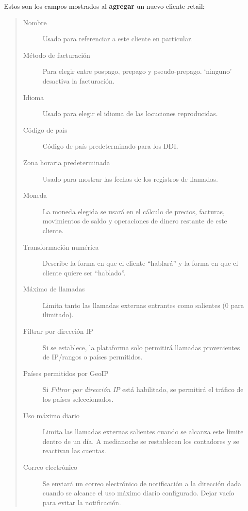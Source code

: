 \documentclass[letterpaper,10pt,spanish]{sphinxmanual}
\begin{document}
Estos son los campos mostrados al \textbf{agregar} un nuevo cliente retail:
\begin{quote}
\begin{description}
\item[{Nombre}] \leavevmode
Usado para referenciar a este cliente en particular.

\item[{Método de facturación}] \leavevmode
Para elegir entre pospago, prepago y pseudo-prepago. `ninguno' desactiva la facturación.

\item[{Idioma}] \leavevmode
Usado para elegir el idioma de las locuciones reproducidas.

\item[{Código de país}] \leavevmode
Código de país predeterminado para los DDI.

\item[{Zona horaria predeterminada}] \leavevmode
Usado para mostrar las fechas de los registros de llamadas.

\item[{Moneda}] \leavevmode
La moneda elegida se usará en el cálculo de precios, facturas, movimientos de saldo y operaciones de dinero restante de este cliente.

\item[{Transformación numérica}] \leavevmode
Describe la forma en que el cliente ``hablará'' y la forma en que el cliente quiere ser ``hablado''.

\item[{Máximo de llamadas}] \leavevmode
Limita tanto las llamadas externas entrantes como salientes (0 para ilimitado).

\item[{Filtrar por dirección IP}] \leavevmode
Si se establece, la plataforma solo permitirá llamadas provenientes de IP/rangos o países permitidos.

\item[{Países permitidos por GeoIP}] \leavevmode
Si \emph{Filtrar por dirección IP} está habilitado, se permitirá el tráfico de los países seleccionados.

\item[{Uso máximo diario}] \leavevmode
Limita las llamadas externas salientes cuando se alcanza este límite dentro de un día. A medianoche se restablecen los contadores y se reactivan las cuentas.

\item[{Correo electrónico}] \leavevmode
Se enviará un correo electrónico de notificación a la dirección dada cuando se alcance el uso máximo diario configurado. Dejar vacío para evitar la notificación.

\end{description}
\end{quote}
\end{document}
